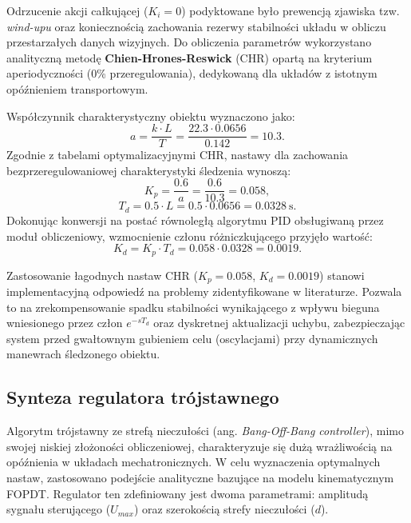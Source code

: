 \documentclass[a4paper,twoside,12pt]{book}
\begin{document}
Odrzucenie akcji całkującej ($K_{i} = 0$) podyktowane było prewencją zjawiska tzw. \textit{wind-upu} oraz koniecznością zachowania rezerwy stabilności układu w obliczu przestarzałych danych wizyjnych. Do obliczenia parametrów wykorzystano analityczną metodę \textbf{Chien-Hrones-Reswick} (CHR) opartą na kryterium aperiodyczności (0\% przeregulowania), dedykowaną dla układów z istotnym opóźnieniem transportowym.

Współczynnik charakterystyczny obiektu wyznaczono jako:
\begin{equation}
a = \frac{k \cdot L}{T} = \frac{22.3 \cdot 0.0656}{0.142} = 10.3.
\end{equation}
Zgodnie z tabelami optymalizacyjnymi CHR\cite{bib:NOWAKOVA2015148}, nastawy dla zachowania bezprzeregulowaniowej charakterystyki śledzenia wynoszą:
\begin{equation}
K_{p} = \frac{0.6}{a} = \frac{0.6}{10.3} = 0.058,
\end{equation}
\begin{equation}
T_{d} = 0.5 \cdot L = 0.5 \cdot 0.0656 = 0.0328~\text{s}.
\end{equation}
Dokonując konwersji na postać równoległą algorytmu PID obsługiwaną przez moduł obliczeniowy, wzmocnienie członu różniczkującego przyjęło wartość:
\begin{equation}
K_{d} = K_{p} \cdot T_{d} = 0.058 \cdot 0.0328 = 0.0019.
\end{equation}

Zastosowanie łagodnych nastaw CHR ($K_{p} = 0.058$, $K_{d} = 0.0019$) stanowi implementacyjną odpowiedź na problemy zidentyfikowane w literaturze. Pozwala to na zrekompensowanie spadku stabilności wynikającego z wpływu bieguna wniesionego przez człon $e^{-sT_{d}}$ oraz dyskretnej aktualizacji uchybu, zabezpieczając system przed gwałtownym gubieniem celu (oscylacjami) przy dynamicznych manewrach śledzonego obiektu.

\newpage
\subsection{Synteza regulatora trójstawnego}
\label{sec:synteza_bang_bang}

Algorytm trójstawny ze strefą nieczułości (ang. \textit{Bang-Off-Bang controller}), mimo swojej niskiej złożoności obliczeniowej, charakteryzuje się dużą wrażliwością na opóźnienia w układach mechatronicznych. W celu wyznaczenia optymalnych nastaw, zastosowano podejście analityczne bazujące na modelu kinematycznym FOPDT. Regulator ten zdefiniowany jest dwoma parametrami: amplitudą sygnału sterującego ($U_{max}$) oraz szerokością strefy nieczułości ($d$).
\end{document}
